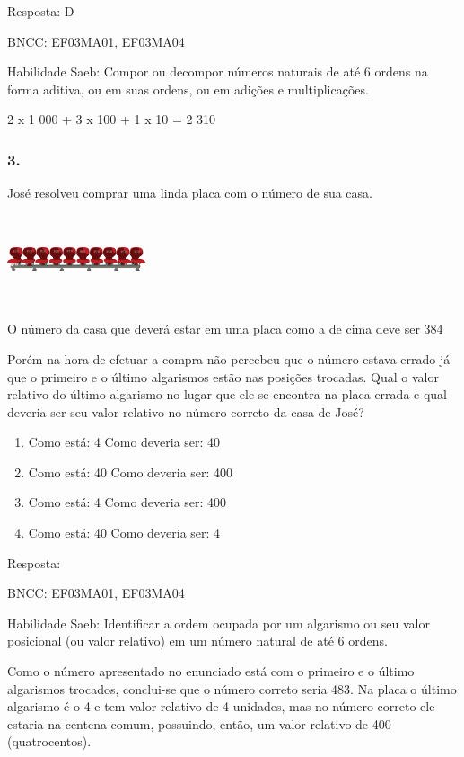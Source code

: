 Resposta: D

BNCC: EF03MA01, EF03MA04

Habilidade Saeb: Compor ou decompor números naturais de até 6 ordens na
forma aditiva, ou em suas ordens, ou em adições e multiplicações.

2 x 1 000 + 3 x 100 + 1 x 10 = 2 310

\subsubsection{3.}\label{section-128}

José resolveu comprar uma linda placa com o número de sua casa.

\includegraphics[width=1.60256in,height=1.03072in]{media/image107.png}

O número da casa que deverá estar em uma placa como a de cima deve ser
384

Porém na hora de efetuar a compra não percebeu que o número estava
errado já que o primeiro e o último algarismos estão nas posições
trocadas. Qual o valor relativo do último algarismo no lugar que ele se
encontra na placa errada e qual deveria ser seu valor relativo no número
correto da casa de José?

\begin{enumerate}
\def\labelenumi{\alph{enumi})}
\item
  Como está: 4 Como deveria ser: 40
\item
  Como está: 40 Como deveria ser: 400
\item
  Como está: 4 Como deveria ser: 400
\item
  Como está: 40 Como deveria ser: 4
\end{enumerate}

Resposta:

BNCC: EF03MA01, EF03MA04

Habilidade Saeb: Identificar a ordem ocupada por um algarismo ou seu
valor posicional (ou valor relativo) em um número natural de até 6
ordens.

Como o número apresentado no enunciado está com o primeiro e o último
algarismos trocados, conclui-se que o número correto seria 483. Na placa
o último algarismo é o 4 e tem valor relativo de 4 unidades, mas no
número correto ele estaria na centena comum, possuindo, então, um valor
relativo de 400 (quatrocentos).

